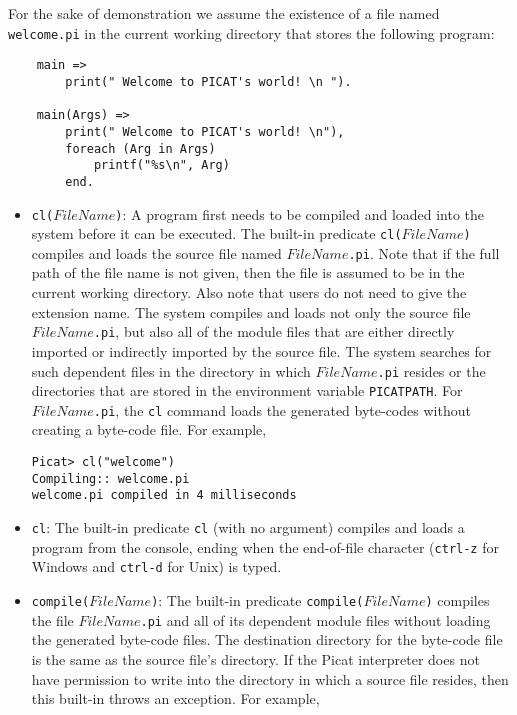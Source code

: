 For the sake of demonstration we assume the existence of a file named \texttt{welcome.pi} in the current working directory that stores the following program:
\begin{verbatim}
    main =>
        print(" Welcome to PICAT's world! \n ").

    main(Args) =>
        print(" Welcome to PICAT's world! \n"),
        foreach (Arg in Args)
            printf("%s\n", Arg)
        end.
\end{verbatim}

\begin{itemize}
\item \texttt{cl($FileName$)}: A program first needs to be compiled and loaded into the system before it can be executed. The built-in predicate \texttt{cl($FileName$)} compiles and loads the source file named \texttt{$FileName$.pi}. Note that if the full path of the file name is not given, then the file is assumed to be in the current working directory. Also note that users do not need to give the extension name. The system compiles and loads not only the source file \texttt{$FileName$.pi}, but also all of the module files that are either directly imported or indirectly imported by the source file. The system searches for such dependent files in the directory in which \texttt{$FileName$.pi} resides or the directories that are stored in the environment variable \texttt{PICATPATH}. For \texttt{$FileName$.pi}, the \texttt{cl} command loads the generated byte-codes without creating a byte-code file. For example,
\begin{verbatim}
Picat> cl("welcome")
Compiling:: welcome.pi
welcome.pi compiled in 4 milliseconds
\end{verbatim}

\item \texttt{cl}: The built-in predicate \texttt{cl} (with no argument) compiles and loads a program from the console, ending when the end-of-file character ({\tt ctrl-z} for Windows and {\tt ctrl-d} for Unix) is typed.

\item \texttt{compile($FileName$)}: The built-in predicate \texttt{compile($FileName$)} compiles the file \texttt{$FileName$.pi} and all of its dependent module files without loading the generated byte-code files. The destination directory for the byte-code file is the same as the source file's directory. If the Picat interpreter does not have permission to write into the directory in which a source file resides, then this built-in throws an exception. For example,


\end{itemize}
